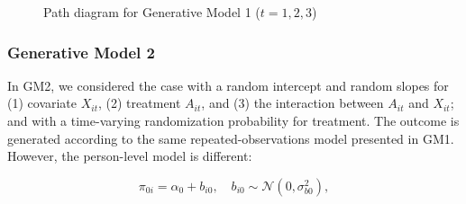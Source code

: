\documentclass[
  12pt,
  a4paper,
]{article}
\begin{document}
\begin{figure}[H]

\caption{\label{fig-GM1_path}Path diagram for Generative Model 1
(\(t = 1, 2, 3\))}


\end{figure}%

\subsubsection{Generative Model 2}\label{generative-model-2}

In GM2, we considered the case with a random intercept and random slopes
for (1) covariate \(X_{it}\), (2) treatment \(A_{it}\), and (3) the
interaction between \(A_{it}\) and \(X_{it}\); and with a time-varying
randomization probability for treatment. The outcome is generated
according to the same repeated-observations model presented in GM1.
However, the person-level model is different:

\[
\pi_{0i} = \alpha_0 + b_{i0}, \quad b_{i0} \sim \mathcal{N}(0, \sigma_{b0}^2),
\]
\end{document}

